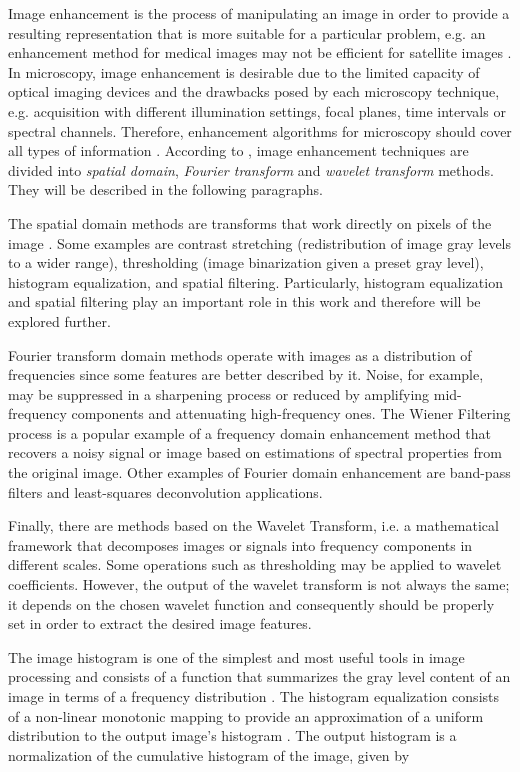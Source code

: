 Image enhancement is the process of manipulating an image in order to provide a resulting representation that is more suitable for a particular problem, e.g. an enhancement method for medical images may not be efficient for satellite images \cite{gonzalez2018digital}. In microscopy, image enhancement is desirable due to the limited capacity of optical imaging devices and the drawbacks posed by each microscopy technique, e.g. acquisition with different illumination settings, focal planes, time intervals or spectral channels. Therefore, enhancement algorithms for microscopy should cover all types of information \cite{wu2008microscope}. According to , image enhancement techniques are divided into \emph{spatial domain}, \emph{Fourier transform} and \emph{wavelet transform} methods. They will be described in the following paragraphs. 

The spatial domain methods are transforms that work directly on pixels of the image \cite{gonzalez2018digital}. Some examples are contrast stretching (redistribution of image gray levels to a wider range), thresholding (image binarization given a preset gray level), histogram equalization, and spatial filtering. Particularly, histogram equalization and spatial filtering play an important role in this work and therefore will be explored further.

Fourier transform domain methods operate with images as a distribution of frequencies since some features are better described by it. Noise, for example, may be suppressed in a sharpening process or reduced by amplifying mid-frequency components and attenuating high-frequency ones. The Wiener Filtering process is a popular example of a frequency domain enhancement method that recovers a noisy signal or image based on estimations of spectral properties from the original image. Other examples of Fourier domain enhancement are band-pass filters and least-squares deconvolution applications. 

Finally, there are methods based on the Wavelet Transform, i.e. a mathematical framework that decomposes images or signals into frequency components in different scales. Some operations such as thresholding may be applied to wavelet coefficients. However, the output of the wavelet transform is not always the same; it depends on the chosen wavelet function and consequently should be properly set in order to extract the desired image features.

The image histogram is one of the simplest and most useful tools in image processing and consists of a function that summarizes the gray level content of an image in terms of a frequency distribution \cite{castleman1996digital}. The histogram equalization consists of a non-linear monotonic mapping to provide an approximation of a uniform distribution to the output image's histogram \cite{gonzalez2018digital}. The output histogram is a normalization of the cumulative histogram of the image, given by

